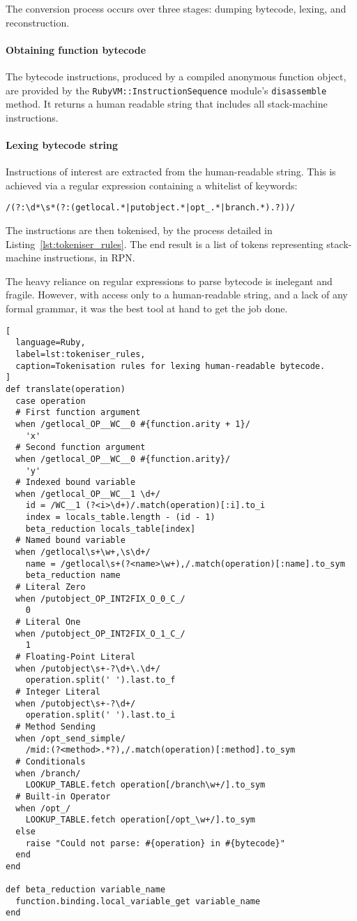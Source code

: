 The conversion process occurs over three stages: dumping bytecode, lexing, and reconstruction.

\paragraph*{Obtaining function bytecode}
The bytecode instructions, produced by a compiled anonymous function object, are provided by the \verb|RubyVM::InstructionSequence| module's \verb|disassemble| method.
It returns a human readable string that includes all stack-machine instructions.

\paragraph*{Lexing bytecode string}
Instructions of interest are extracted from the human-readable string. This is achieved via a regular expression containing a whitelist of keywords:
\begin{verbatim}
/(?:\d*\s*(?:(getlocal.*|putobject.*|opt_.*|branch.*).?))/
\end{verbatim}

The instructions are then tokenised, by the process detailed in Listing~\ref{lst:tokeniser_rules}.
The end result is a list of tokens representing stack-machine instructions, in \ac{RPN}.

The heavy reliance on regular expressions to parse bytecode is inelegant and fragile.
However, with access only to a human-readable string, and a lack of any formal grammar, it was the best tool at hand to get the job done.

\begin{lstlisting}[
  language=Ruby,
  label=lst:tokeniser_rules,
  caption=Tokenisation rules for lexing human-readable bytecode.
]
def translate(operation)
  case operation
  # First function argument
  when /getlocal_OP__WC__0 #{function.arity + 1}/
    'x'
  # Second function argument
  when /getlocal_OP__WC__0 #{function.arity}/
    'y'
  # Indexed bound variable
  when /getlocal_OP__WC__1 \d+/
    id = /WC__1 (?<i>\d+)/.match(operation)[:i].to_i
    index = locals_table.length - (id - 1)
    beta_reduction locals_table[index]
  # Named bound variable
  when /getlocal\s+\w+,\s\d+/
    name = /getlocal\s+(?<name>\w+),/.match(operation)[:name].to_sym
    beta_reduction name
  # Literal Zero
  when /putobject_OP_INT2FIX_O_0_C_/
    0
  # Literal One
  when /putobject_OP_INT2FIX_O_1_C_/
    1
  # Floating-Point Literal
  when /putobject\s+-?\d+\.\d+/
    operation.split(' ').last.to_f
  # Integer Literal
  when /putobject\s+-?\d+/
    operation.split(' ').last.to_i
  # Method Sending
  when /opt_send_simple/
    /mid:(?<method>.*?),/.match(operation)[:method].to_sym
  # Conditionals
  when /branch/
    LOOKUP_TABLE.fetch operation[/branch\w+/].to_sym
  # Built-in Operator
  when /opt_/
    LOOKUP_TABLE.fetch operation[/opt_\w+/].to_sym
  else
    raise "Could not parse: #{operation} in #{bytecode}"
  end
end

def beta_reduction variable_name
  function.binding.local_variable_get variable_name
end
\end{lstlisting}

